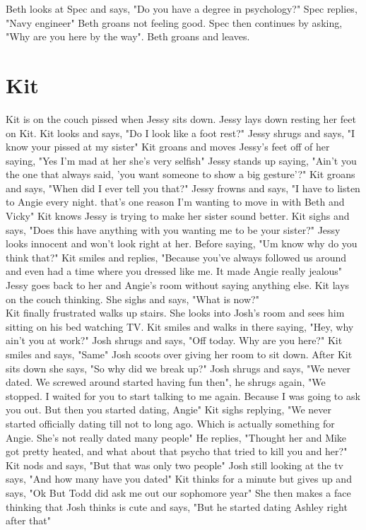 \documentclass{article}[12px] %
\begin{document}
Beth looks at Spec and says, "Do you have a degree in psychology?" Spec replies, "Navy engineer" Beth groans not feeling good. Spec then continues by asking, "Why are you here by the way". Beth groans and leaves.\\

\section* {Kit}
Kit is on the couch pissed when Jessy sits down. Jessy lays down resting her feet on Kit. Kit looks and says, "Do I look like a foot rest?" Jessy shrugs and says, "I know your pissed at my sister" Kit groans and moves Jessy's feet off of her saying, "Yes I'm mad at her she's very selfish" Jessy stands up saying, "Ain't you the one that always said, 'you want someone to show a big gesture'?" Kit groans and says, "When did I ever tell you that?" Jessy frowns and says, "I have to listen to Angie every night. that's one reason I'm wanting to move in with Beth and Vicky" Kit knows Jessy is trying to make her sister sound better. Kit sighs and says, "Does this have anything with you wanting me to be your sister?" Jessy looks innocent and won't look right at her. Before saying, "Um know why do you think that?" Kit smiles and replies, "Because you've always followed us around and even had a time where you dressed like me. It made Angie really jealous"\\

Jessy goes back to her and Angie's room without saying anything else. Kit lays on the couch thinking. She sighs and says, "What is now?"\\

Kit finally frustrated walks up stairs. She looks into Josh's room and sees him sitting on his bed watching TV. Kit smiles and walks in there saying, "Hey, why ain't you at work?" Josh shrugs and says, "Off today. Why are you here?" Kit smiles and says, "Same" Josh scoots over giving her room to sit down. After Kit sits down she says, "So why did we break up?" Josh shrugs and says, "We never dated. We screwed around started having fun then", he shrugs again, "We stopped. I waited for you to start talking to me again. Because I was going to ask you out. But then you started dating, Angie" Kit sighs replying, "We never started officially dating till not to long ago. Which is actually something for Angie. She's not really dated many people" He replies, "Thought her and Mike got pretty heated, and what about that psycho that tried to kill you and her?" Kit nods and says, "But that was only two people" Josh still looking at the tv says, "And how many have you dated" Kit thinks for a minute but gives up and says, "Ok But Todd did ask me out our sophomore year" She then makes a face thinking that Josh thinks is cute and says, "But he started dating Ashley right after that"\\
\end{document}
